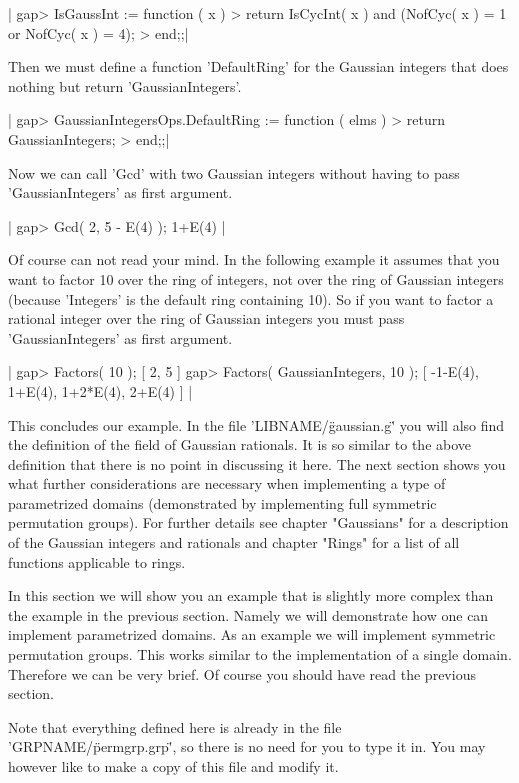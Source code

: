 |    gap> IsGaussInt := function ( x )
    >     return IsCycInt( x ) and (NofCyc( x ) = 1 or NofCyc( x ) = 4);
    > end;;|


Then  we must define a function 'DefaultRing'  for  the Gaussian integers
that does nothing but return 'GaussianIntegers'.

|    gap> GaussianIntegersOps.DefaultRing := function ( elms )
    >     return GaussianIntegers;
    > end;;|

Now we can call 'Gcd' with two Gaussian  integers without  having to pass
'GaussianIntegers' as first argument.

|    gap> Gcd( 2, 5 - E(4) );
    1+E(4) |

Of course {\GAP}  can  not  read your mind.  In the following  example it
assumes that you want to factor 10 over the  ring  of  integers, not over
the ring of  Gaussian  integers (because 'Integers'  is the default  ring
containing 10).  So if you want  to factor  a rational integer  over  the
ring  of Gaussian  integers you  must  pass  'GaussianIntegers' as  first
argument.

|    gap> Factors( 10 );
    [ 2, 5 ]
    gap> Factors( GaussianIntegers, 10 );
    [ -1-E(4), 1+E(4), 1+2*E(4), 2+E(4) ] |

This  concludes our example.   In  the file  'LIBNAME/\"gaussian.g\"' you
will also find the definition of the field of  Gaussian rationals.  It is
so similar to the above definition that  there  is no point in discussing
it here.  The  next section shows  you  what  further considerations  are
necessary when implementing a type of parametrized  domains (demonstrated
by implementing full symmetric permutation groups).   For further details
see chapter "Gaussians" for a  description of  the Gaussian integers  and
rationals and chapter  "Rings" for a list of  all functions applicable to
rings.


In this section we will show you an example that is slightly more complex
than the example in the previous section.  Namely we will demonstrate how
one can implement  parametrized domains.  As an example we will implement
symmetric permutation groups.  This works similar to  the  implementation
of a  single domain.   Therefore  we  can be very brief.   Of course  you
should have read the previous section.

Note   that   everything   defined   here   is   already   in   the  file
'GRPNAME/\"permgrp.grp\"',  so there  is no need  for  you to type it in.
You may however like to make a copy of this file and modify it.

